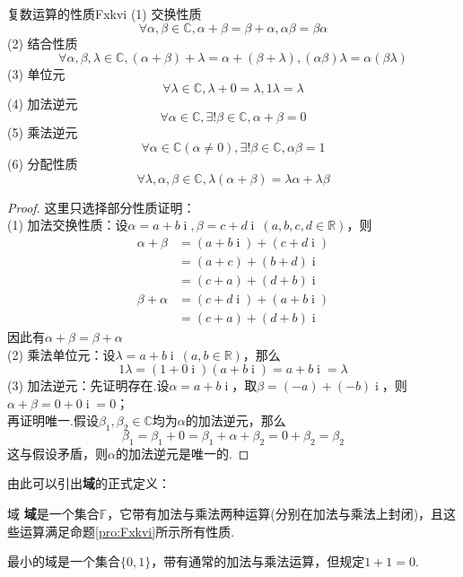 \documentclass[lang=cn, zihao=5]{elegantbook}
\newcommand{\R}{\mathbb{R}}
\newcommand{\C}{\mathbb{C}}
\newcommand{\F}{\mathbb{F}}
\DeclareMathOperator{\ic}{i}
\begin{document}
\begin{proposition}{复数运算的性质}{Fxkvi}
	(1) 交换性质$$\forall \alpha , \beta \in \C , \alpha + \beta = \beta + \alpha , \alpha \beta = \beta \alpha$$
	(2) 结合性质$$\forall \alpha , \beta , \lambda \in \C , (\alpha + \beta) + \lambda = \alpha + (\beta + \lambda) , (\alpha \beta) \lambda = \alpha (\beta \lambda)$$
	(3) 单位元$$\forall \lambda \in \C , \lambda + 0 = \lambda , 1 \lambda = \lambda$$
	(4) 加法逆元$$\forall \alpha \in \C , \exists ! \beta \in \C , \alpha + \beta = 0$$
	(5) 乘法逆元$$\forall \alpha \in \C (\alpha \neq 0) , \exists ! \beta \in \C , \alpha \beta = 1$$
	(6) 分配性质$$\forall \lambda , \alpha , \beta \in \C , \lambda (\alpha + \beta) = \lambda \alpha + \lambda \beta$$
\end{proposition}
\begin{proof}
	这里只选择部分性质证明： \\
	(1) 加法交换性质：设$\alpha = a+b\ic , \beta = c+d\ic ~(a,b,c,d \in \R )$，则
	\begin{align*}
		\alpha + \beta &= (a+b\ic ) + (c+d\ic ) \\
		&= (a+c) + (b+d)\ic \\
		&= (c+a) + (d+b)\ic \\
		\beta + \alpha &= (c+d\ic ) + (a+b\ic ) \\
		&= (c+a) + (d+b)\ic
	\end{align*}
	因此有$\alpha + \beta = \beta + \alpha$ \\
	(2) 乘法单位元：设$\lambda = a+b\ic ~ (a,b \in \R )$，那么$$1 \lambda = (1+0\ic )(a+b\ic ) = a + b\ic = \lambda$$
	(3) 加法逆元：先证明存在.设$\alpha = a+b\ic $，取$\beta = (-a) + (-b)\ic $，则$\alpha + \beta = 0+0\ic = 0$；\\
	再证明唯一.假设$\beta _1, \beta _2 \in \C $均为$\alpha$的加法逆元，那么$$\beta _1 = \beta _1 + 0 = \beta _1 + \alpha + \beta _2 = 0 + \beta _2 = \beta _2$$
	这与假设矛盾，则$\alpha$的加法逆元是唯一的.
\end{proof}

由此可以引出\textbf{域}的正式定义：

\begin{definition}{域}
	\textbf{域}是一个集合$\F$，它带有加法与乘法两种运算(分别在加法与乘法上封闭)，且这些运算满足命题\ref{pro:Fxkvi}所示所有性质.
\end{definition}
\begin{remark}
	最小的域是一个集合$\{ 0,1 \}$，带有通常的加法与乘法运算，但规定$1+1=0$.
\end{remark}
\end{document}
